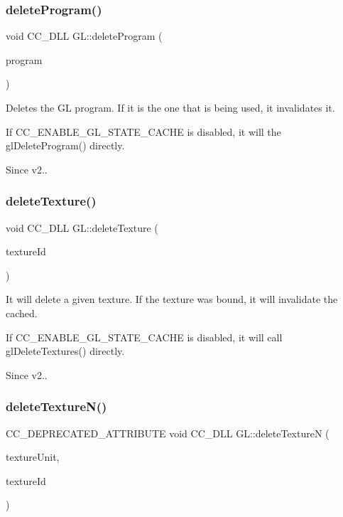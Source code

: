 \subsubsection{\texorpdfstring{delete\+Program()}{deleteProgram()}}
{\footnotesize\ttfamily void C\+C\+\_\+\+D\+LL G\+L\+::delete\+Program (\begin{DoxyParamCaption}\item[{G\+Luint}]{program }\end{DoxyParamCaption})}

Deletes the GL program. If it is the one that is being used, it invalidates it.

If C\+C\+\_\+\+E\+N\+A\+B\+L\+E\+\_\+\+G\+L\+\_\+\+S\+T\+A\+T\+E\+\_\+\+C\+A\+C\+HE is disabled, it will the gl\+Delete\+Program() directly. \begin{DoxySince}{Since}
v2.. 
\end{DoxySince}
\mbox{\label{group__renderer_gade1503e565e17f126d7b9e134c203fda}} 
\subsubsection{\texorpdfstring{delete\+Texture()}{deleteTexture()}}
{\footnotesize\ttfamily void C\+C\+\_\+\+D\+LL G\+L\+::delete\+Texture (\begin{DoxyParamCaption}\item[{G\+Luint}]{texture\+Id }\end{DoxyParamCaption})}

It will delete a given texture. If the texture was bound, it will invalidate the cached.

If C\+C\+\_\+\+E\+N\+A\+B\+L\+E\+\_\+\+G\+L\+\_\+\+S\+T\+A\+T\+E\+\_\+\+C\+A\+C\+HE is disabled, it will call gl\+Delete\+Textures() directly. \begin{DoxySince}{Since}
v2.. 
\end{DoxySince}
\mbox{\label{group__renderer_ga37672bf0ea82a58b76da9aaf2e1708b8}} 
\subsubsection{\texorpdfstring{delete\+Texture\+N()}{deleteTextureN()}}
{\footnotesize\ttfamily C\+C\+\_\+\+D\+E\+P\+R\+E\+C\+A\+T\+E\+D\+\_\+\+A\+T\+T\+R\+I\+B\+U\+TE void C\+C\+\_\+\+D\+LL G\+L\+::delete\+TextureN (\begin{DoxyParamCaption}\item[{G\+Luint}]{texture\+Unit,  }\item[{G\+Luint}]{texture\+Id }\end{DoxyParamCaption})}

